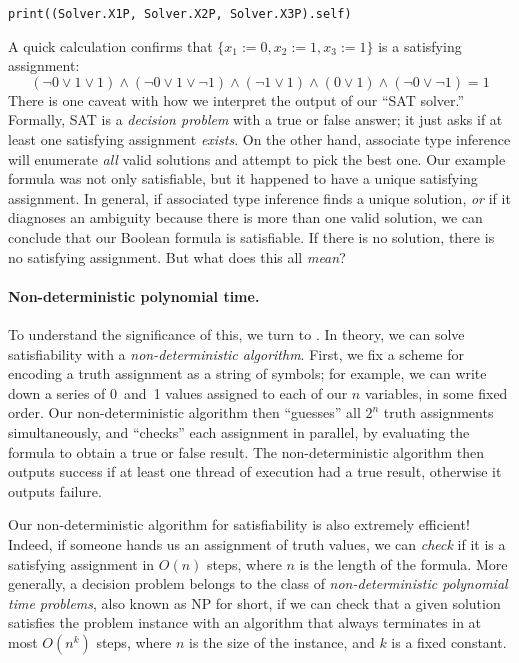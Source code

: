 \documentclass[../generics]{subfiles}
\begin{document}
\begin{Verbatim}
print((Solver.X1P, Solver.X2P, Solver.X3P).self)
\end{Verbatim}
A quick calculation confirms that $\{x_1 := 0, x_2 := 1, x_3 := 1\}$ is a satisfying assignment:
\[
(\neg 0 \vee 1 \vee 1) \wedge (\neg 0 \vee 1 \vee \neg 1) \wedge (\neg 1 \vee 1) \wedge (0 \vee 1) \wedge (\neg 0 \vee \neg 1) = 1
\]
There is one caveat with how we interpret the output of our ``SAT solver.'' Formally, SAT is a \emph{decision problem} with a true or false answer; it just asks if at least one satisfying assignment \emph{exists}. On the other hand, associate type inference will enumerate \emph{all} valid solutions and attempt to pick the best one. Our example formula was not only satisfiable, but it happened to have a unique satisfying assignment. In general, if associated type inference finds a unique solution, \emph{or} if it diagnoses an ambiguity because there is more than one valid solution, we can conclude that our Boolean formula is satisfiable. If there is no solution, there is no satisfying assignment. But what does this all \emph{mean}?

\paragraph{Non-deterministic polynomial time.}
To understand the significance of this, we turn to \cite{garey1979computers}.
In theory, we can solve satisfiability with a \emph{non-deterministic algorithm}. First, we fix a scheme for encoding a truth assignment as a string of symbols; for example, we can write down a series of 0~and~1 values assigned to each of our $n$ variables, in some fixed order. Our non-deterministic algorithm then ``guesses'' all $2^n$ truth assignments simultaneously, and ``checks'' each assignment in parallel, by evaluating the formula to obtain a true or false result. The non-deterministic algorithm then outputs success if at least one thread of execution had a true result, otherwise it outputs failure.

Our non-deterministic algorithm for satisfiability is also extremely efficient! Indeed, if someone hands us an assignment of truth values, we can \emph{check} if it is a satisfying assignment in $O(n)$ steps, where $n$ is the length of the formula. More generally, a decision problem belongs to the class of \emph{non-deterministic polynomial time problems}, also known as NP for short, if we can check that a given solution satisfies the problem instance with an algorithm that always terminates in at most $O(n^k)$ steps, where $n$ is the size of the instance, and $k$ is a fixed constant.
\end{document}
